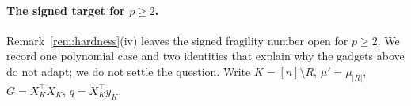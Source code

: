 

\paragraph{The signed target for $p\ge2$.} Remark~\ref{rem:hardness}(iv) leaves the signed fragility number open for $p\ge2$. We record one polynomial case and two identities that explain why the gadgets above do not adapt; we do not settle the question. Write $K=[n]\setminus R$, $\mu'=\mu_{|R|}$, $G=X_K^{\top}X_K$, $q=X_K^{\top}y_K$.

